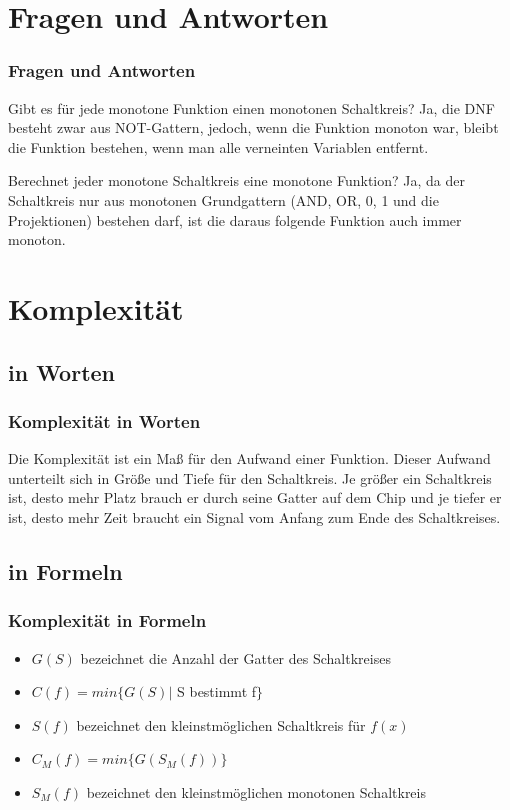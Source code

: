 \documentclass[hyperref={pdfpagelabels=false}]{beamer} %
\begin{document}
  \section{Fragen und Antworten}
  \begin{frame}%
    \frametitle{Fragen und Antworten}
    \begin{block}{Gibt es für jede monotone Funktion einen monotonen Schaltkreis?}
      Ja, die DNF besteht zwar aus NOT-Gattern, jedoch, wenn die Funktion monoton war, bleibt die Funktion bestehen, wenn man alle verneinten Variablen entfernt.
    \end{block}
    \begin{block}{Berechnet jeder monotone Schaltkreis eine monotone Funktion?}
      Ja, da der Schaltkreis nur aus monotonen Grundgattern (AND, OR, 0, 1 und die Projektionen) bestehen darf, ist die daraus folgende Funktion auch immer monoton.
    \end{block}
  \end{frame}

  \section{Komplexität}
  \subsection*{in Worten}
    \begin{frame}%
    \frametitle{Komplexität in Worten}
    Die Komplexität ist ein Maß für den Aufwand einer Funktion.
    Dieser Aufwand unterteilt sich in Grö\ss{}e und Tiefe f\"ur den Schaltkreis.
    Je grö\ss{}er ein Schaltkreis ist, desto mehr Platz brauch er durch seine Gatter auf dem Chip und je tiefer er ist, desto mehr Zeit braucht ein Signal vom Anfang zum Ende des Schaltkreises.
  \end{frame}

  \subsection*{in Formeln}
  \begin{frame}
    \frametitle{Komplexität in Formeln}
    \begin{itemize}
      \item $G(S)$ bezeichnet die Anzahl der Gatter des Schaltkreises
      \item $C(f) = min \{G(S) |$ S bestimmt f$\}$
      \item $S(f)$ bezeichnet den kleinstmöglichen Schaltkreis für $f(x)$
      \item $C_M(f) = min \{G(S_M(f))\}$
      \item $S_M(f)$ bezeichnet den kleinstmöglichen monotonen Schaltkreis
    \end{itemize}
  \end{frame}
\end{document}
